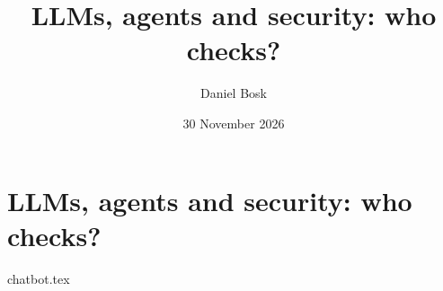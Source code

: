 \documentclass[a4paper,10pt,oneside,openright,
               oldfontcommands]{memoir}
\begin{document}
\title{%
  LLMs, agents and security: who checks?
}
\author{Daniel Bosk}
\date{30 November 2026}

\maketitle

\begin{abstract}
  
\end{abstract}

\clearpage

\tableofcontents*

\chapter{LLMs, agents and security: who checks?}



\appendix
{chatbot.tex}


\printbibliography
\end{document}

